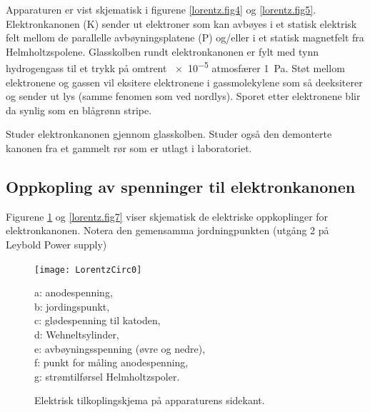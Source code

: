\documentclass[../Elmag-labhefte-2020.tex]{subfiles}
\begin{document}
Apparaturen er vist skjematisk i figurene \ref{lorentz.fig4} og  \ref{lorentz.fig5}. Elektronkanonen (\textsf{K}) sender ut elektroner som kan avbøyes i et statisk elektrisk felt mellom de parallelle avbøyningsplatene (\textsf{P}) og/eller i et statisk magnetfelt fra Helmholtzspolene. Glasskolben rundt elektronkanonen er fylt med tynn hydrogengass til et trykk på omtrent \num{e-5} atmosfærer \SI{1}{\pascal}. Støt mellom elektronene og gassen vil eksitere elektronene i gassmolekylene som så deeksiterer og sender ut lys (samme fenomen som ved nordlys). Sporet etter elektronene blir da synlig som en blågrønn stripe. 

{\itsf Studer elektronkanonen gjennom glasskolben. Studer også den demonterte kanonen fra et gammelt rør som er utlagt i laboratoriet.}
\newpage
\subsection{Oppkopling av spenninger til elektronkanonen}

Figurene \ref{lorentz.fig6} og \ref{lorentz.fig7} viser skjematisk de elektriske oppkoplinger for elektronkanonen. Notera den gemensamma jordningpunkten (utgång 2 på Leybold Power supply)

\begin{figure}[!ht]
    \vspace{-9em}
    \texttt{[image: LorentzCirc0]}
    \begin{minipage}[b]{0.42\textwidth}
        \textsf{%
            a: anodespenning,\\
            b: jordingspunkt,\\
            c: glødespenning til katoden,\\
            d: Wehneltsylinder,\\
            e: avbøyningsspenning (øvre og nedre),\\
            f: punkt for måling anodespenning,\\
            g: strømtilførsel Helmholtzspoler.
            \vspace{15mm}
        }
    \end{minipage}
    \caption{%
        Elektrisk tilkoplingskjema på apparaturens sidekant.
    }
    \label{lorentz.fig6}
\end{figure}
\end{document}
